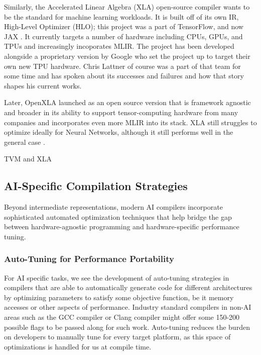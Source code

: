 \documentclass[manuscript,screen,review,format=acmsmall]{acmart}
\begin{document}
Similarly, the Accelerated Linear Algebra (XLA) open-source compiler wants to be the standard for machine learning workloads. It is built off of its own IR, High-Level Optimizer (HLO); this project was a part of TensorFlow, and now JAX \cite{DemeureNestor2023HGca}. It currently targets a number of hardware including CPUs, GPUs, and TPUs and increasingly incoporates MLIR. The project has been developed alongside a proprietary version by Google who set the project up to target their own new TPU hardware. Chris Lattner of course was a part of that team for some time and has spoken about its successes and failures \cite{Modular8} and how that story shapes his current works. 

Later, OpenXLA launched as an open source version that is framework agnostic and broader in its ability to support tensor-computing hardware from many companies and incorporates even more MLIR into its stack. XLA still struggles to optimize ideally for Neural Networks, although it still performs well in the general case \cite{XLAArticle}.



TVM and XLA







\subsection{AI-Specific Compilation Strategies}


Beyond intermediate representations, modern AI compilers incorporate sophisticated automated optimization techniques that help bridge the gap between hardware-agnostic programming and hardware-specific performance tuning.

\subsubsection{Auto-Tuning for Performance Portability} %

For AI specific tasks, we see the development of auto-tuning strategies in compilers that are able to automatically generate code for different architectures by optimizing parameters to satisfy some objective function, be it memory accesses or other aspects of performance. Industry standard compilers in non-AI areas such as the GCC compiler or Clang compiler might offer some 150-200 possible flags to be passed along for such work. Auto-tuning reduces the burden on developers to manually tune for every target platform, as this space of optimizations is handled for us at compile time. 
\end{document}
